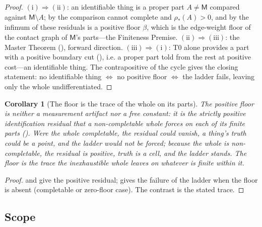 \documentclass[11pt,a4paper]{article}
\theoremstyle{thmstyle}
\newtheorem{corollary}[theorem]{Corollary}
\theoremstyle{definition}
\theoremstyle{remark}
\newcommand{\floorc}{\beta}               %
\newcommand{\med}{\mathsf{M}}             %
\newcommand{\idres}{\rho_{\!*}}            %
\begin{document}
\begin{proof}
$(\mathrm{i})\Rightarrow(\mathrm{ii})$: an identifiable thing is a proper part
$A\neq\med$ compared against $\med\setminus A$; by  the
comparison cannot complete and $\idres(A)>0$, and by  the
infimum of these residuals is a positive floor $\floorc$, which is the edge-weight
floor of the contact graph of $\med$'s parts---the Finiteness Premise.
$(\mathrm{ii})\Rightarrow(\mathrm{iii})$: the Master Theorem (),
forward direction. $(\mathrm{iii})\Rightarrow(\mathrm{i})$: T0 alone provides a
part with a positive boundary cut (), i.e. a proper part told from
the rest at positive cost---an identifiable thing. The contrapositive of the cycle
gives the closing statement: no identifiable thing $\iff$ no positive floor
$\iff$ the ladder fails, leaving only the whole undifferentiated.
\end{proof}

\begin{corollary}[The floor is the trace of the whole on its parts]
\label{cor:trace}
The positive floor is neither a measurement artifact nor a free constant: it is
the strictly positive identification residual that a non-completable whole forces
on each of its finite parts \textup{(}\textup{)}. Were
the whole completable, the residual could vanish, a thing's truth could be a
point, and the ladder would not be forced; because the whole is non-completable,
the residual is positive, truth is a cell, and the ladder stands. The floor is the
trace the inexhaustible whole leaves on whatever is finite within it.
\end{corollary}

\begin{proof}
 and  give the positive
residual;  gives the failure of the ladder when the floor is
absent (completable or zero-floor case). The contrast is the stated trace.
\end{proof}

\subsection{Scope}
\end{document}
